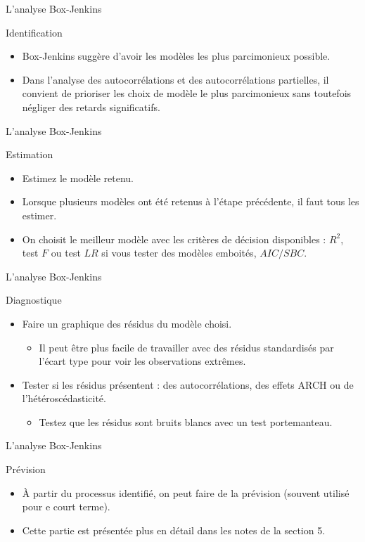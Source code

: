 \documentclass{beamer}
\begin{document}
\begin{frame}{L’analyse Box-Jenkins}
\begin{block}{Identification}
\begin{itemize}
\item Box-Jenkins suggère d’avoir les modèles les plus parcimonieux possible. 
\item Dans l’analyse des autocorrélations et des autocorrélations partielles, il convient de prioriser les choix de modèle le plus parcimonieux sans toutefois négliger des retards significatifs.
\end{itemize}
\end{block}
\end{frame}

\begin{frame}{L’analyse Box-Jenkins}
\begin{block}{Estimation}
\begin{itemize}
\item Estimez le modèle retenu. 
\item Lorsque plusieurs modèles ont été retenus à l’étape précédente, il faut tous les estimer. 
\item On choisit le meilleur modèle avec les critères de décision disponibles : $R^2$, test $F$ ou test $LR$ si vous tester des modèles emboités, $AIC/SBC$.
\end{itemize}
\end{block}
\end{frame}


\begin{frame}{L’analyse Box-Jenkins}
\begin{block}{Diagnostique}
\begin{itemize}
\item Faire un graphique des résidus du modèle choisi.
\begin{itemize} 
\item Il peut être plus facile de travailler avec des résidus standardisés par l’écart type pour voir les observations extrêmes.
\end{itemize}
\item Tester si les résidus présentent : des autocorrélations, des effets ARCH ou de l’hétéroscédasticité. 
\begin{itemize}
\item Testez que les résidus sont bruits blancs avec un test portemanteau.
\end{itemize}
\end{itemize}
\end{block}
\end{frame}


\begin{frame}{L’analyse Box-Jenkins}
\begin{block}{Prévision}
\begin{itemize}
\item À partir du processus identifié, on peut faire de la prévision (souvent utilisé pour e court terme). 
\item Cette partie est présentée plus en détail dans les notes de la section 5.
\end{itemize}
\end{block}
\end{frame}
\end{document}
